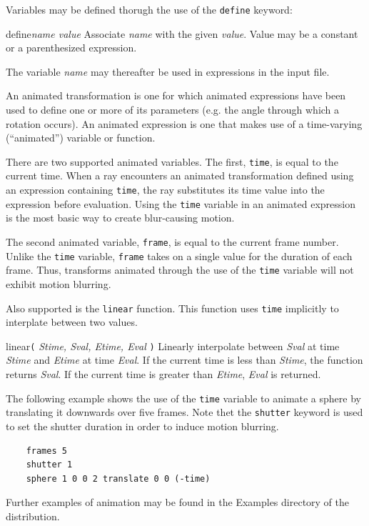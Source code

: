 Variables may be defined thorugh the use of the {\tt define} keyword:

\begin{defkey}{define}{{\em name value}}
	Associate {\em name} with the given {\em value}.  Value may
	be a constant or a parenthesized expression.
\end{defkey}
The variable {\em name} may thereafter be used in expressions in the
input file.

An animated transformation is one for which animated expressions have
been used to define one or more of its parameters (e.g. the angle through
which a rotation occurs).  An animated expression is one that makes
use of a time-varying (``animated'') variable or function.

There are two supported animated variables.
The first, {\tt time}, is equal to the current time.
When a ray encounters an animated
transformation defined using an expression containing {\tt time}, the ray
substitutes its time value into the expression before evaluation.
Using the {\tt time} variable in an animated expression is the most
basic way to create blur-causing motion.

The second animated variable, {\tt frame}, is equal to the current
frame number.  Unlike the {\tt time} variable, {\tt frame} takes on
a single value for the duration of each frame.  Thus, transforms
animated through the use of the {\tt time} variable will not exhibit
motion blurring.

Also supported is the {\tt linear} function.  This function uses
{\tt time} implicitly to interplate between two values.

\begin{defkey}{linear}{{\tt (} {\em Stime, Sval, Etime, Eval} {\tt )}}
	Linearly interpolate between {\em Sval} at time
	{\em Stime} and {\em Etime} at time {\em Eval}.
	If the current time is less than {\em Stime}, the function
	returns {\em Sval}.  If the current time is greater than
	{\em Etime}, {\em Eval} is returned.
\end{defkey}

The following example shows the use of the {\tt time} variable to
animate a sphere by translating it downwards over five frames.
Note thet the {\tt shutter} keyword is used to set the shutter duration
in order to induce motion blurring.

\begin{verbatim}
    frames 5
    shutter 1
    sphere 1 0 0 2 translate 0 0 (-time)
\end{verbatim}

Further examples of animation may be found in the Examples directory
of the \rayshade distribution.
